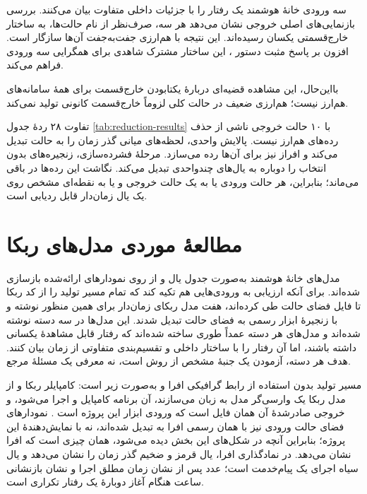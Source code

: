 سه ورودی خانهٔ هوشمند یک رفتار را با جزئیات داخلی متفاوت بیان می‌کنند. بررسی بازنمایی‌های اصلی خروجی نشان می‌دهد هر سه، صرف‌نظر از نام حالت‌ها، به ساختار خارج‌قسمتی یکسان رسیده‌اند. این نتیجه با هم‌ارزی جفت‌به‌جفت آن‌ها سازگار است. افزون بر پاسخ مثبت دستور ، این ساختار مشترک شاهدی برای همگرایی سه ورودی فراهم می‌کند.

بااین‌حال، این مشاهده قضیه‌ای دربارهٔ یکتابودن خارج‌قسمت برای همهٔ سامانه‌های هم‌ارز نیست؛ هم‌ارزی ضعیف در حالت کلی لزوماً خارج‌قسمت کانونی تولید نمی‌کند.

تفاوت ۲۸ ردهٔ جدول \ref{tab:reduction-results} با ۱۰ حالت خروجی ناشی از حذف رده‌های هم‌ارز نیست. پالایش واحدی، لحظه‌های میانی گذر زمان را به حالت تبدیل می‌کند و افراز نیز برای آن‌ها رده می‌سازد. مرحلهٔ فشرده‌سازی، زنجیره‌های بدون انتخاب را دوباره به یال‌های چندواحدی تبدیل می‌کند. نگاشت این رده‌ها در  باقی می‌ماند؛ بنابراین، هر حالت ورودی یا به یک حالت خروجی و یا به نقطه‌ای مشخص روی یک یال زمان‌دار قابل ردیابی است.

\section{مطالعهٔ موردی مدل‌های ربکا}
\label{sec:rebeca-case-studies}

مدل‌های خانهٔ هوشمند به‌صورت جدول یال و از روی نمودارهای ارائه‌شده بازسازی شده‌اند. برای آنکه ارزیابی به ورودی‌هایی هم تکیه کند که تمام مسیر تولید را از کد ربکا تا فایل فضای حالت طی کرده‌اند، هفت مدل ربکای زمان‌دار برای همین منظور نوشته و با زنجیرهٔ ابزار رسمی به فضای حالت تبدیل شدند. این مدل‌ها در سه دسته نوشته شده‌اند و مدل‌های هر دسته عمداً طوری ساخته شده‌اند که رفتار قابل مشاهدهٔ یکسانی داشته باشند، اما آن رفتار را با ساختار داخلی و تقسیم‌بندی متفاوتی از زمان بیان کنند. هدف هر دسته، آزمودن یک جنبهٔ مشخص از روش است، نه معرفی یک مسئلهٔ مرجع.

مسیر تولید بدون استفاده از رابط گرافیکی افرا و به‌صورت زیر است: کامپایلر ربکا و  از مدل ربکا یک وارسی‌گر مدل به زبان  می‌سازند، آن برنامه کامپایل و اجرا می‌شود، و خروجی صادرشدهٔ آن همان فایل  است که ورودی ابزار این پروژه است \cite{RMCGitHub2026,AfraWeakTimedReduction2026}. نمودارهای فضای حالت ورودی نیز با همان  رسمی افرا به  تبدیل شده‌اند، نه با نمایش‌دهندهٔ این پروژه؛ بنابراین آنچه در شکل‌های این بخش دیده می‌شود، همان چیزی است که افرا نشان می‌دهد. در نمادگذاری افرا، یال قرمز و ضخیم گذر زمان را نشان می‌دهد و یال سیاه اجرای یک پیام‌خدمت است؛ عدد پس از نشان  زمان مطلق اجرا و نشان  بازنشانی ساعت هنگام آغاز دوبارهٔ یک رفتار تکراری است.

